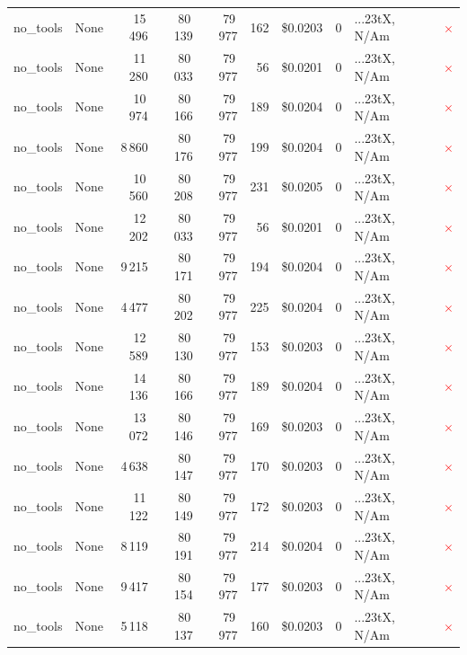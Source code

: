 \documentclass[a4paper,11pt]{article}
\begin{document}
\begin{table}[H]
{\begin{tabular}{l r r r r r r r l c}
no\_tools & None & 15\,496 & 80\,139 & 79\,977 & 162 & \$0.0203 & 0 & ...23tX, N/Am & \textcolor{red}{\(\times\)} \\
no\_tools & None & 11\,280 & 80\,033 & 79\,977 & 56 & \$0.0201 & 0 & ...23tX, N/Am & \textcolor{red}{\(\times\)} \\
no\_tools & None & 10\,974 & 80\,166 & 79\,977 & 189 & \$0.0204 & 0 & ...23tX, N/Am & \textcolor{red}{\(\times\)} \\
no\_tools & None & 8\,860 & 80\,176 & 79\,977 & 199 & \$0.0204 & 0 & ...23tX, N/Am & \textcolor{red}{\(\times\)} \\
no\_tools & None & 10\,560 & 80\,208 & 79\,977 & 231 & \$0.0205 & 0 & ...23tX, N/Am & \textcolor{red}{\(\times\)} \\
no\_tools & None & 12\,202 & 80\,033 & 79\,977 & 56 & \$0.0201 & 0 & ...23tX, N/Am & \textcolor{red}{\(\times\)} \\
no\_tools & None & 9\,215 & 80\,171 & 79\,977 & 194 & \$0.0204 & 0 & ...23tX, N/Am & \textcolor{red}{\(\times\)} \\
no\_tools & None & 4\,477 & 80\,202 & 79\,977 & 225 & \$0.0204 & 0 & ...23tX, N/Am & \textcolor{red}{\(\times\)} \\
no\_tools & None & 12\,589 & 80\,130 & 79\,977 & 153 & \$0.0203 & 0 & ...23tX, N/Am & \textcolor{red}{\(\times\)} \\
no\_tools & None & 14\,136 & 80\,166 & 79\,977 & 189 & \$0.0204 & 0 & ...23tX, N/Am & \textcolor{red}{\(\times\)} \\
no\_tools & None & 13\,072 & 80\,146 & 79\,977 & 169 & \$0.0203 & 0 & ...23tX, N/Am & \textcolor{red}{\(\times\)} \\
no\_tools & None & 4\,638 & 80\,147 & 79\,977 & 170 & \$0.0203 & 0 & ...23tX, N/Am & \textcolor{red}{\(\times\)} \\
no\_tools & None & 11\,122 & 80\,149 & 79\,977 & 172 & \$0.0203 & 0 & ...23tX, N/Am & \textcolor{red}{\(\times\)} \\
no\_tools & None & 8\,119 & 80\,191 & 79\,977 & 214 & \$0.0204 & 0 & ...23tX, N/Am & \textcolor{red}{\(\times\)} \\
no\_tools & None & 9\,417 & 80\,154 & 79\,977 & 177 & \$0.0203 & 0 & ...23tX, N/Am & \textcolor{red}{\(\times\)} \\
no\_tools & None & 5\,118 & 80\,137 & 79\,977 & 160 & \$0.0203 & 0 & ...23tX, N/Am & \textcolor{red}{\(\times\)} \\
\bottomrule
\end{tabular}}
\end{table}
\end{document}
